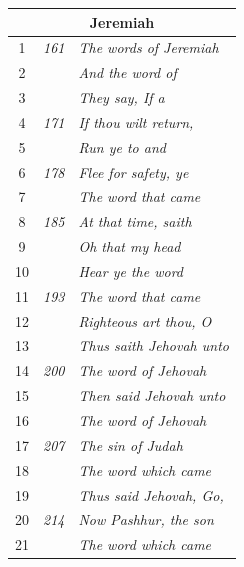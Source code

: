 \documentclass{article}
\newlength{\minipageheight}
\newlength{\minipagewidth}
\begin{document}
\begin{minipage}[r][\minipageheight][t]{\minipagewidth}
\begin{longtable}{ccl}
        \multicolumn{3}{c}{\textbf{Jeremiah}}                              \\
        \hline
        1           & \textit{161}   & \textit{The words of Jeremiah}      \\
        2           &                & \textit{And the word of}            \\
        3           &                & \textit{They say, If a}             \\
        4           & \textit{171}   & \textit{If thou wilt return,}       \\
        5           &                & \textit{Run ye to and}              \\
        6           & \textit{178}   & \textit{Flee for safety, ye}        \\
        7           &                & \textit{The word that came}         \\
        8           & \textit{185}   & \textit{At that time, saith}        \\
        9           &                & \textit{Oh that my head}            \\
        10          &                & \textit{Hear ye the word}           \\
        11          & \textit{193}   & \textit{The word that came}         \\
        12          &                & \textit{Righteous art thou, O}      \\
        13          &                & \textit{Thus saith Jehovah unto}    \\
        14          & \textit{200}   & \textit{The word of Jehovah}        \\
        15          &                & \textit{Then said Jehovah unto}     \\
        16          &                & \textit{The word of Jehovah}        \\
        17          & \textit{207}   & \textit{The sin of Judah}           \\
        18          &                & \textit{The word which came}        \\
        19          &                & \textit{Thus said Jehovah, Go,}     \\
        20          & \textit{214}   & \textit{Now Pashhur, the son}       \\
        21          &                & \textit{The word which came}        \\

\end{longtable}
\end{minipage}
\end{document}
